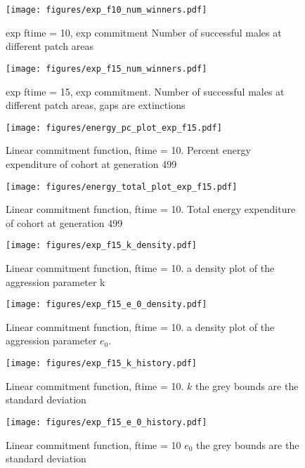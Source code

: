 \documentclass[a4paper,11pt]{article}
\begin{document}
\begin{figure}[h!]
    \centering
    \texttt{[image: figures/exp\_f10\_num\_winners.pdf]}
    \caption{exp ftime = 10, exp commitment Number of successful males at different patch areas}
    \label{fig:num winners expf10}

    \texttt{[image: figures/exp\_f15\_num\_winners.pdf]}
    \caption{exp ftime = 15, exp commitment. Number of successful males at different patch areas, gaps are extinctions}
    \label{fig:num winners}
\end{figure}


\begin{figure}[h!]
    \centering
    \texttt{[image: figures/energy\_pc\_plot\_exp\_f15.pdf]}
    \caption{Linear commitment function, ftime = 10. Percent energy expenditure of cohort at generation 499}
    \label{fig:var energy pc}
    \centering

    \texttt{[image: figures/energy\_total\_plot\_exp\_f15.pdf]}
    \caption{Linear commitment function, ftime = 10. Total energy expenditure of cohort at generation 499}
    \label{fig:var energy total}
\end{figure}

\begin{figure}[h!]
    \centering
    \texttt{[image: figures/exp\_f15\_k\_density.pdf]}
    \caption{Linear commitment function, ftime = 10. a density plot of the aggression parameter k}
    \label{fig:k density}

    \texttt{[image: figures/exp\_f15\_e\_0\_density.pdf]}
    \caption{Linear commitment function, ftime = 10. a density plot of the aggression parameter $e_0$.}
    \label{fig:e_0 density}
\end{figure}

\begin{figure}[h!]
    \centering
    \texttt{[image: figures/exp\_f15\_k\_history.pdf]}
    \caption{Linear commitment function, ftime = 10. $k$ the grey bounds are the standard deviation}

    \texttt{[image: figures/exp\_f15\_e\_0\_history.pdf]}
    \caption{Linear commitment function, ftime = 10 $e_0$ the grey bounds are the standard deviation}
\end{figure}
\end{document}
